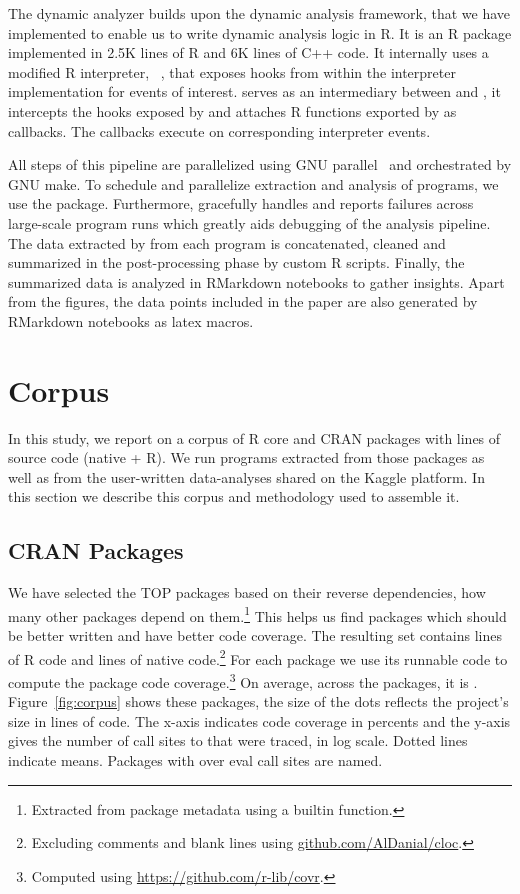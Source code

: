 \documentclass[conference]{IEEEtran}
\begin{document}
The dynamic analyzer builds upon the dynamic analysis framework, \instrumentr
that we have implemented to enable us to write dynamic analysis logic in R. It
is an R package implemented in 2.5K lines of R and 6K lines of C++ code. It
internally uses a modified R interpreter, \rdyntrace~\cite{oopsla19a}, that
exposes hooks from within the interpreter implementation for events of interest.
\instrumentr serves as an intermediary between \rdyntrace and \evil, it
intercepts the hooks exposed by \rdyntrace and attaches R functions exported by
\evil as callbacks. The \evil callbacks execute on corresponding interpreter
events.

All steps of this pipeline are parallelized using GNU
parallel~\cite{GNUparallel} and orchestrated by GNU make. To schedule and
parallelize extraction and analysis of programs, we use the \runr
package. Furthermore, \runr gracefully handles and reports failures across
large-scale program runs which greatly aids debugging of the analysis
pipeline.  The data extracted by \evil from each program is concatenated,
cleaned and summarized in the post-processing phase by custom R
scripts. Finally, the summarized data is analyzed in RMarkdown notebooks to
gather insights. Apart from the figures, the data points included in the
paper are also generated by RMarkdown notebooks as latex macros.

\section{Corpus}

In this study, we report on a corpus of \CorpusCorePackages R core and
\CorpusPackages CRAN packages with \CorpusAllCodeRnd lines of source code
(native + R).  We run \CorpusAllProgramsRnd programs extracted from those
packages as well as from the user-written data-analyses shared on the Kaggle
platform. In this section we describe this corpus and methodology used to
assemble it.

\subsection{CRAN Packages}

We have selected the TOP \CorpusPackages packages based on their reverse
dependencies, \ie how many other packages depend on them.\footnote{Extracted
  from package metadata using a builtin function.}  This helps us find
packages which should be better written and have better code coverage.  The
resulting set contains \CorpusRCodeRnd lines of R code and
\CorpusNativeCodeRnd lines of native code.\footnote{Excluding comments and
  blank lines using \url{github.com/AlDanial/cloc}.}  For each package we
use its runnable code to compute the package code coverage.\footnote{Computed
  using \url{ https://github.com/r-lib/covr}.} On average, across the
\CorpusPackages packages, it is \CorpusMeanExprCoverage.
Figure~\ref{fig:corpus} shows these packages, the size of the dots reflects
the project's size in lines of code.  The x-axis indicates code coverage in
percents and the y-axis gives the number of call sites to \eval that were traced, in log
scale. Dotted lines indicate means. Packages with over
\CorpusEvalsPackageTreshold eval call sites are named.
\end{document}
